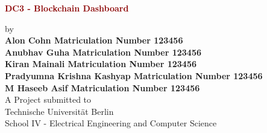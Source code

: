 \begin{titlepage}
	\strut
	\hfill
	\begin{center}
	\vspace{1cm}
		\Huge
		\begin{spacing}{.9}
			\textcolor{DarkRed}{\textbf{DC3 - Blockchain Dashboard}}\\
		\end{spacing}
		\vspace{0.8cm}
		\large
		by\\
		\vspace{0.8cm}
		\textbf{Alon Cohn Matriculation Number 123456}\\
		\textbf{Anubhav Guha Matriculation Number 123456}\\
		\textbf{Kiran Mainali Matriculation Number 123456}\\
		\textbf{Pradyumna Krishna Kashyap Matriculation Number 123456}\\
		\textbf{M Haseeb Asif Matriculation Number 123456}\\
		\vspace{0.8cm}
		\vspace{2cm}
	 	A Project submitted to\\
		\vspace{0.5cm}
		Technische Universität Berlin\\
		School IV - Electrical Engineering and Computer Science\\

\end{center}
\end{titlepage}
